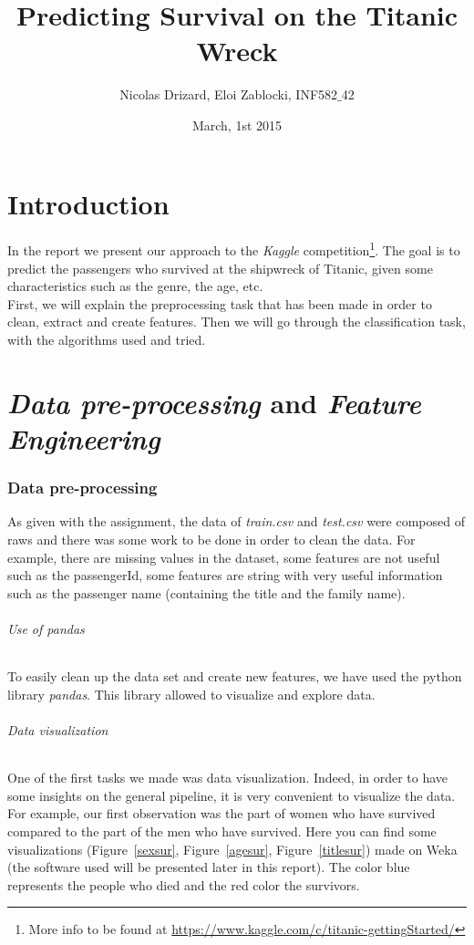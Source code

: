 \documentclass[11pt,a4paper,portrait]{article}
\author{Nicolas Drizard, Eloi Zablocki, INF582$\_$42}
\date{March, 1st 2015}
\title{Predicting Survival on the Titanic Wreck}
\begin{document}
\maketitle


\newpage
\part*{Introduction}
In the report we present our approach to the \textit{Kaggle} competition\footnote{More info to be found at \url{https://www.kaggle.com/c/titanic-gettingStarted/}}. The goal is to predict the passengers who survived at the shipwreck of Titanic, given some characteristics such as the genre, the age, etc.\\
First, we will explain the preprocessing task that has been made in order to clean, extract and create features. Then we will go through the classification task, with the algorithms used and tried.

\part{\textit{Data pre-processing} and \textit{Feature Engineering}}
\setcounter{section}{0}


\section{Data pre-processing}
As given with the assignment, the data of \textit{train.csv} and \textit{test.csv} were composed of raws and there was some work to be done in order to clean the data. For example, there are missing values in the dataset, some features are not useful such as the passengerId, some features are string with very useful information such as the passenger name (containing the title and the family name).

\paragraph{Use of pandas}
To easily clean up the data set and create new features, we have used the python library \textit{pandas}. This library allowed to visualize and explore data.

\paragraph{Data visualization}
One of the first tasks we made was data visualization. Indeed, in order to have some insights on the general pipeline, it is very convenient to visualize the data. For example, our first observation was the part of women who have survived compared to the part of the men who have survived. Here you can find some visualizations (Figure~\ref{sexsur}, Figure~\ref{agesur}, Figure~\ref{titlesur}) made on Weka (the software used will be presented later in this report). The color blue represents the people who died and the red color the survivors.
\end{document}
